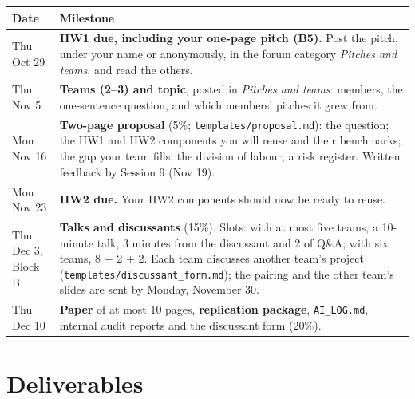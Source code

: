 \documentclass[11pt]{article}
\begin{document}
\begin{center}
\small
\renewcommand{\arraystretch}{1.2}
\begin{tabularx}{\linewidth}{@{}p{3.3cm}L@{}}
\toprule
\textbf{Date} & \textbf{Milestone} \\
\midrule
Thu Oct 29 & \textbf{HW1 due, including your one-page pitch (B5).} Post the pitch, under your name or
anonymously, in the forum category \emph{Pitches and teams}, and read the others. \\
Thu Nov 5 & \textbf{Teams (2--3) and topic}, posted in \emph{Pitches and teams}: members, the one-sentence
question, and which members' pitches it grew from. \\
Mon Nov 16 & \textbf{Two-page proposal} (5\%; \texttt{templates/proposal.md}): the question; the HW1 and HW2
components you will reuse and their benchmarks; the gap your team fills; the division of
labour; a risk register. Written feedback by Session 9 (Nov 19). \\
Mon Nov 23 & \textbf{HW2 due.} Your HW2 components should now be ready to reuse. \\
Thu Dec 3, Block B & \textbf{Talks and discussants} (15\%). Slots: with at most five teams, a 10-minute talk,
3 minutes from the discussant and 2 of Q\&A; with six teams, 8 + 2 + 2. Each team discusses
another team's project (\texttt{templates/discussant\_form.md}); the pairing and the other team's
slides are sent by Monday, November 30. \\
Thu Dec 10 & \textbf{Paper} of at most 10 pages, \textbf{replication package}, \texttt{AI\_LOG.md}, internal
audit reports and the discussant form (20\%). \\
\bottomrule
\end{tabularx}
\end{center}

\section{Deliverables}
\end{document}
